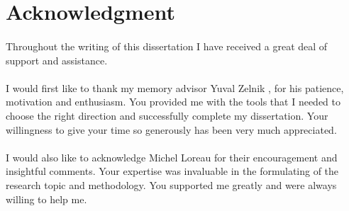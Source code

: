 \documentclass{article}
\begin{document}
\newpage
\paragraph{}
\tableofcontents



\newpage
\listoffigures



\newpage

\listoftables

\listofalgorithms




\newpage
\section*{Acknowledgment}


\paragraph{}
Throughout the writing of this dissertation I have received a great deal of support and assistance.

\paragraph{}
I would first like to thank my memory advisor Yuval Zelnik , for his patience, motivation and enthusiasm. You provided me with the tools that I needed to choose the right direction and successfully complete my dissertation. Your willingness to give your time so generously has been very much appreciated. 

\paragraph{}
I would also like to acknowledge Michel Loreau for their encouragement and insightful comments. Your expertise was invaluable in the formulating of the research topic and methodology. You supported me greatly and were always willing to help me.
\end{document}
